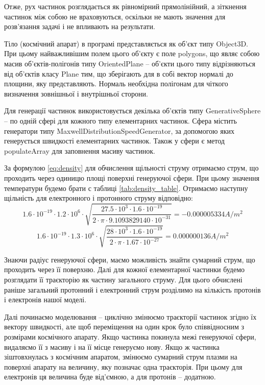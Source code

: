 \documentclass[a4paper,12pt]{article}
\begin{document}
Отже, рух частинок розглядається як рівномірний прямолінійний, а зіткнення частинок між собою не враховуються, оскільки не мають значення для розв’язання задачі і не впливають на результати.

Тіло (космічний апарат) в програмі представляється як об’єкт типу Object3D. При цьому найважливішим полем цього об’єкту є поле polygons, що являє собою масив об’єктів-полігонів типу OrientedPlane -- об’єкти цього типу відрізняються від об’єктів класу Plane тим, що зберігають для в собі вектор нормалі до площини, яку представляють. Нормаль необхідна полігонам для чіткого визначення зовнішньої і внутрішньої сторони.

Для генерації частинок використовується декілька об’єктів типу GenerativeSphere -- по одній сфері для кожного типу елементарних частинок. Сфера містить генератори типу MaxwellDistributionSpeedGenerator, за допомогою яких генерується швидкості елементарних частинок. Також у сфери є метод populateArray для заповнення масиву частинок.

За формулою \ref{eq:density} для обчислення щільності струму отримаємо струм, що проходить через одиницю площі поверхні генеруючої сфери. При цьому значення температури будемо брати с таблиці \ref{tab:density_table}. Отримаємо наступну щільність для електронного і протонного струму відповідно:
\[1.6 \cdot 10^{-19} \cdot 1.2 \cdot 10^6 \cdot \sqrt{\frac{27.5 \cdot 10^3 \cdot 1.6 \cdot 10^{-19}}{2 \cdot \pi \cdot 9.1093829140 \cdot 10^{-31}}} = -0.000005334 A/m^2\]
\[1.6 \cdot 10^{-19} \cdot 1.3 \cdot 10^6 \cdot \sqrt{\frac{28 \cdot 10^3 \cdot 1.6 \cdot 10^{-19}}{2 \cdot \pi \cdot 1.67 \cdot 10^{-27}}} = 0.000000136 A/m^2\]

Знаючи радіус генеруючої сфери, маємо можливість знайти сумарний струм, що проходить через її поверхню. Далі для кожної елементарної частинки будемо розглядати її траєкторію як частину загального струму. Для цього обчислені раніше загальний протонний і електронний струм розділимо на кількість протонів і електронів нашої моделі.

Далі починаємо моделювання -- циклічно змінюємо траєкторії частинок згідно їх вектору швидкості, але щоб переміщення на один крок було співвідносним з розмірами космічного апарату. Якщо частинка покинула межі генеруючої сфери, видаляємо її з масиву і на її місце генеруємо нову. Якщо ж частинка зіштовхнулась з космічним апаратом, змінюємо сумарний струм плазми на поверхні апарату на величину, яку позначає одна траєкторія. При цьому для електронів ця величина буде від’ємною, а для протонів -- додатною.
\end{document}

